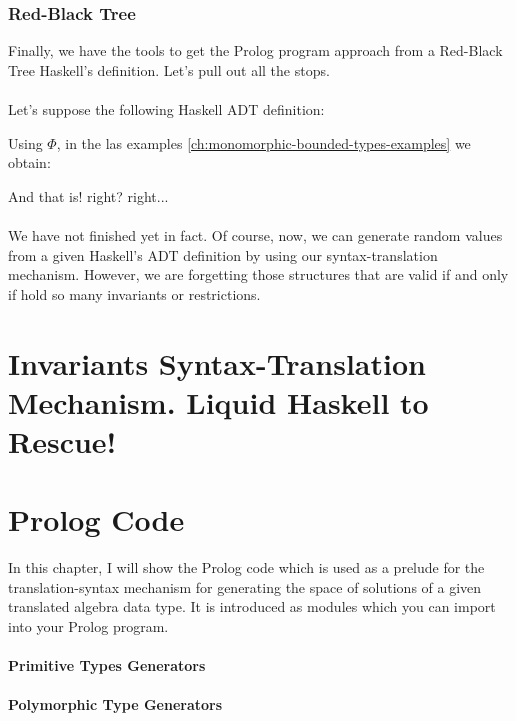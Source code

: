 \documentclass{report}
\theoremstyle{definition}
\theoremstyle{definition}
\begin{document}
	\subsection{Red-Black Tree}
	Finally, we have the tools to get the Prolog program approach from a Red-Black Tree Haskell's definition. Let's pull out all the stops.\\\\
	Let's suppose the following Haskell ADT definition:
	
	Using $\Phi$, in the las examples \ref{ch:monomorphic-bounded-types-examples} we obtain:
	
	And that is! right? right...\\\\
	We have not finished yet in fact. Of course, now, we can generate random values from a given Haskell's ADT definition by using our syntax-translation mechanism. However, we are forgetting those structures that are valid if and only if hold so many invariants or restrictions.
	\chapter{Invariants Syntax-Translation Mechanism. Liquid Haskell to Rescue!}
	\appendix
	\chapter{Prolog Code}
	In this chapter, I will show the Prolog code which is used as a prelude for the translation-syntax mechanism for generating the space of solutions of a given translated algebra data type. It is introduced as modules which you can import into your Prolog program.
	\subsubsection*{Primitive Types Generators}
	
	\subsubsection*{Polymorphic Type Generators}
	
\end{document}
